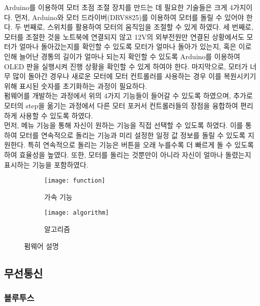Arduino를 이용하여 모터 초점 조절 장치를 만드는 데 필요한 기술들은 크게 4가지이다. 먼저, Arduino와 모터 드라이버(DRV8825)를 이용하여 모터를 돌릴 수 있어야 한다. 두 번째로, 스위치를 활용하여 모터의 움직임을 조절할 수 있게 하였다. 세 번째로, 모터를 조절한 것을 노트북에 연결되지 않고 12V의 외부전원만 연결된 상황에서도 모터가 얼마나 돌아갔는지를 확인할 수 있도록 모터가 얼마나 돌아가 있는지, 혹은 이로 인해 늘어난 경통의 길이가 얼마나 되는지 확인할 수 있도록 Arduino를 이용하여 OLED 판을 실행시켜 진행 상황을 확인할 수 있게 하여야 한다. 마지막으로, 모터가 너무 많이 돌아간 경우나 새로운 모터에 모터 컨트롤러를 사용하는 경우 이를 복원시키기 위해 표시된 숫자를 초기화하는 과정이 필요하다.\\
펌웨어를 개발하는 과정에서 위의 4가지 기능들이 들어갈 수 있도록 하였으며, 추가로 모터의 step을 옮기는 과정에서 다른 모터 포커서 컨트롤러들의 장점을 융합하여 편리하게 사용할 수 있도록 하였다.\\
먼저, 메뉴 기능을 통해 자신이 원하는 기능을 직접 선택할 수 있도록 하였다. 이를 통하여 모터를 연속적으로 돌리는 기능과 미리 설정한 일정 값 정보를 돌릴 수 있도록 지원한다. 특히 연속적으로 돌리는 기능은 버튼을 오래 누를수록 더 빠르게 돌 수 있도록 하여 효율성을 높였다. 또한, 모터를 돌리는 것뿐만이 아니라 자신이 얼마나 돌렸는지 표시하는 기능을 포함하였다.
\begin{figure}[h]
	\begin{subfigure}{0.5\textwidth}
		\texttt{[image: function]} 
		\caption{가속 기능}
		\label{fig:function}
	\end{subfigure}
	\begin{subfigure}{0.5\textwidth}
		\texttt{[image: algorithm]}
		\caption{알고리즘}
		\label{fig:algorithm}
	\end{subfigure}
	\caption{펌웨어 설명}
	\label{fig:image3}
\end{figure}

\subsection{무선통신}

\subsubsection{블루투스}


